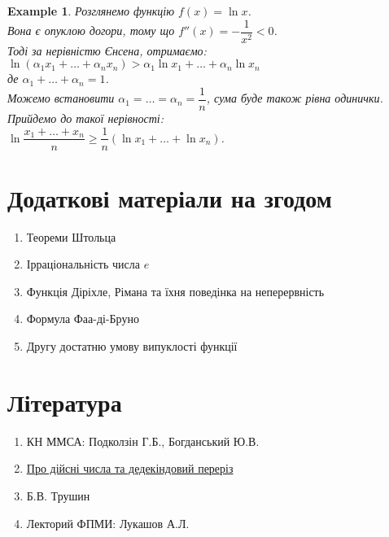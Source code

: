 \documentclass[a4paper, 14pt]{article}
\theoremstyle{theoremdd}
\theoremstyle{theoremdd}
\theoremstyle{theoremdd}
\theoremstyle{theoremdd}
\newtheorem{example}[theorem]{Example}
\theoremstyle{theoremdd}
\theoremstyle{theoremdd}
\theoremstyle{theoremdd}
\theoremstyle{theoremdd}
\begin{document}
\begin{example}
Розглянемо функцію $f(x) = \ln x$.\\
Вона є опуклою догори, тому що $f''(x) = -\dfrac{1}{x^2} < 0$.\\
Тоді за нерівністю Єнсена, отримаємо:\\
$\ln(\alpha_1 x_1 + \dots + \alpha_n x_n) > \alpha_1 \ln x_1 + \dots + \alpha_n \ln x_n$\\
де $\alpha_1 + \dots + \alpha_n = 1$.\\
Можемо встановити $\alpha_1 = \dots = \alpha_n = \dfrac{1}{n}$, сума буде також рівна одинички. Прийдемо до такої нерівності:\\
$\ln \dfrac{x_1+\dots+x_n}{n} \geq \dfrac{1}{n} \left( \ln x_1 + \dots + \ln x_n \right)$.
\end{example}
\newpage

\section*{Додаткові матеріали на згодом}
\begin{enumerate}
\item Теореми Штольца
\item Ірраціональність числа $e$
\item Функція Діріхле, Рімана та їхня поведінка на неперервність
\item Формула Фаа-ді-Бруно
\item Другу достатню умову випуклості функції
\end{enumerate}

\section*{Література}
\begin{enumerate}
\item КН ММСА: Подколзін Г.Б., Богданський Ю.В.
\item \href{https://www.math.brown.edu/reschwar/INF/handout3.pdf}{Про дійсні числа та дедекіндовий переріз}
\item Б.В. Трушин
\item Лекторий ФПМИ: Лукашов А.Л.
\end{enumerate}
\end{document}
